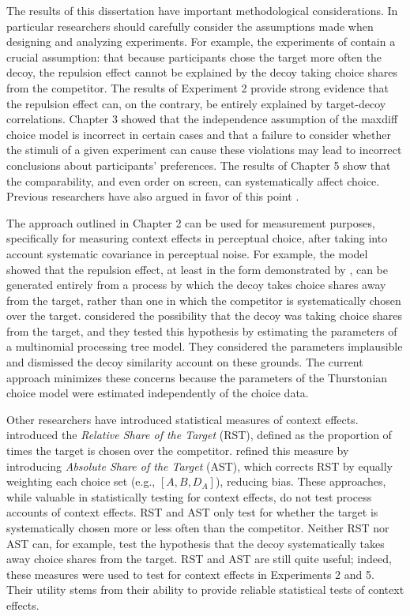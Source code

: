 The results of this dissertation have important methodological considerations. In particular researchers should carefully consider the assumptions made when designing and analyzing experiments. For example, the experiments of \textcite{spektorWhenGoodLooks2018b} contain a crucial assumption: that because participants chose the target more often the decoy, the repulsion effect cannot be explained by the decoy taking choice shares from the competitor. The results of Experiment 2 provide strong evidence that the repulsion effect can, on the contrary, be entirely explained by target-decoy correlations. Chapter 3 showed that the independence assumption of the maxdiff choice model is incorrect in certain cases and that a failure to consider whether the stimuli of a given experiment can cause these violations may lead to incorrect conclusions about participants' preferences. The results of Chapter 5 show that the comparability, and even order on screen, can systematically affect choice. Previous researchers have also argued in favor of this point \parencite{trueblood2022attentional,hasan2025registered,evansImpactPresentationOrder2021}. 

The approach outlined in Chapter 2 can be used for measurement purposes, specifically for measuring context effects in perceptual choice, after taking into account systematic covariance in perceptual noise. For example, the model showed that the repulsion effect, at least in the form demonstrated by \textcite{spektorWhenGoodLooks2018b}, can be generated entirely from a process by which the decoy takes choice shares away from the target, rather than one in which the competitor is systematically chosen over the target. \textcite{spektorRepulsionEffectPreferential2022} considered the possibility that the decoy was taking choice shares from the target, and they tested this hypothesis by estimating the parameters of a multinomial processing tree model. They considered the parameters implausible and dismissed the decoy similarity account on these grounds. The current approach minimizes these concerns because the parameters of the Thurstonian choice model were estimated independently of the choice data. 

Other researchers have introduced statistical measures of context effects. \textcite{berkowitschRigorouslyTestingMultialternative2014b} introduced the \textit{Relative Share of the Target} (RST), defined as the proportion of times the target is chosen over the competitor. \textcite{katsimpokisRobustBayesianTest2022} refined this measure by introducing \textit{Absolute Share of the Target} (AST), which corrects RST by equally weighting each choice set (e.g., $[A,B,D_{A}]$), reducing bias. These approaches, while valuable in statistically testing for context effects, do not test process accounts of context effects. RST and AST only test for whether the target is systematically chosen more or less often than the competitor. Neither RST nor AST can, for example, test the hypothesis that the decoy systematically takes away choice shares from the target. RST and AST are still quite useful; indeed, these measures were used to test for context effects in Experiments 2 and 5. Their utility stems from their ability to provide reliable statistical tests of context effects.

